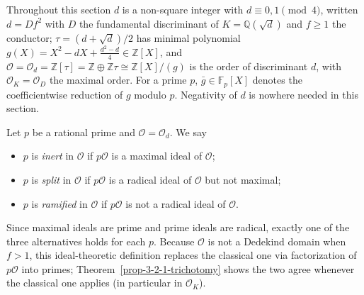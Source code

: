 
Throughout this section $d$ is a non-square integer with $d \equiv 0, 1
\pmod 4$, written $d = D f^2$ with $D$ the fundamental discriminant of
$K = \mathbb{Q}(\sqrt d)$ and $f \geq 1$ the conductor;
$\tau = (d + \sqrt d)/2$ has minimal polynomial
$g(X) = X^2 - dX + \tfrac{d^2 - d}{4} \in \mathbb{Z}[X]$, and
$\mathcal{O} = \mathcal{O}_d = \mathbb{Z}[\tau] = \mathbb{Z} \oplus
\mathbb{Z}\tau \cong \mathbb{Z}[X]/(g)$ is the order of discriminant $d$,
with $\mathcal{O}_K = \mathcal{O}_D$ the maximal order. For a prime $p$,
$\bar g \in \mathbb{F}_p[X]$ denotes the coefficientwise reduction of $g$
modulo $p$. Negativity of $d$ is nowhere needed in this section.

\begin{definition}
  \label{prop-3-2-1-splitting-def}
  Let $p$ be a rational prime and $\mathcal{O} = \mathcal{O}_d$. We say
  \begin{itemize}
    \item $p$ is \emph{inert} in $\mathcal{O}$ if $p\mathcal{O}$ is a maximal
      ideal of $\mathcal{O}$;
    \item $p$ is \emph{split} in $\mathcal{O}$ if $p\mathcal{O}$ is a radical
      ideal of $\mathcal{O}$ but not maximal;
    \item $p$ is \emph{ramified} in $\mathcal{O}$ if $p\mathcal{O}$ is not a
      radical ideal of $\mathcal{O}$.
  \end{itemize}
  Since maximal ideals are prime and prime ideals are radical, exactly one of
  the three alternatives holds for each $p$. Because $\mathcal{O}$ is not a
  Dedekind domain when $f > 1$, this ideal-theoretic definition replaces the
  classical one via factorization of $p\mathcal{O}$ into primes;
  Theorem~\ref{prop-3-2-1-trichotomy} shows the two agree whenever the
  classical one applies (in particular in $\mathcal{O}_K$).
\end{definition}

